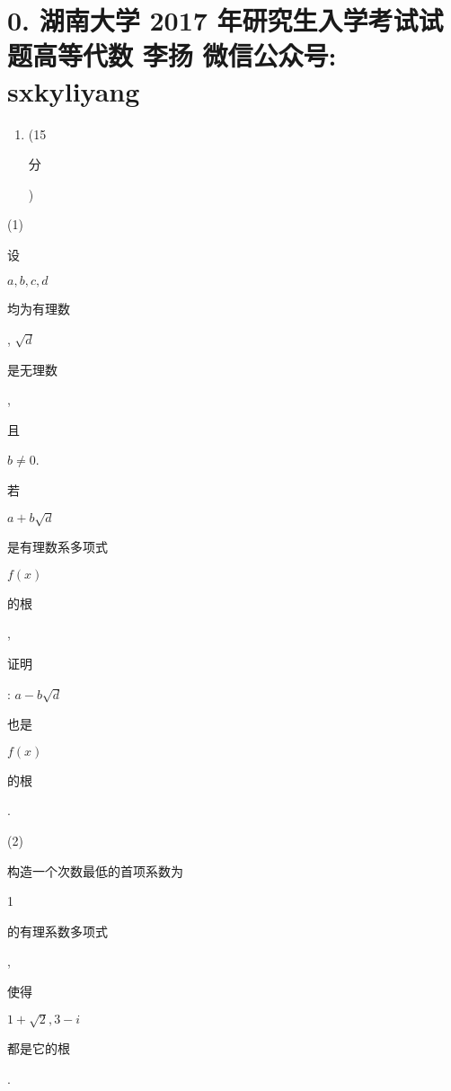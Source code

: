 \documentclass[10pt]{article}
\begin{document}
\section{0. 湖南大学 2017 年研究生入学考试试题高等代数 
 李扬 
 微信公众号: sxkyliyang}
\begin{enumerate}
  \item (15 \begin{CJK}{UTF8}{mj}分\end{CJK})
\end{enumerate}
(1) \begin{CJK}{UTF8}{mj}设\end{CJK} $a, b, c, d$ \begin{CJK}{UTF8}{mj}均为有理数\end{CJK}, $\sqrt{d}$ \begin{CJK}{UTF8}{mj}是无理数\end{CJK}, \begin{CJK}{UTF8}{mj}且\end{CJK} $b \neq 0$. \begin{CJK}{UTF8}{mj}若\end{CJK} $a+b \sqrt{d}$ \begin{CJK}{UTF8}{mj}是有理数系多项式\end{CJK} $f(x)$ \begin{CJK}{UTF8}{mj}的根\end{CJK}, \begin{CJK}{UTF8}{mj}证明\end{CJK}: $a-b \sqrt{d}$ \begin{CJK}{UTF8}{mj}也是\end{CJK} $f(x)$ \begin{CJK}{UTF8}{mj}的根\end{CJK}.

(2) \begin{CJK}{UTF8}{mj}构造一个次数最低的首项系数为\end{CJK} 1 \begin{CJK}{UTF8}{mj}的有理系数多项式\end{CJK}, \begin{CJK}{UTF8}{mj}使得\end{CJK} $1+\sqrt{2}, 3-i$ \begin{CJK}{UTF8}{mj}都是它的根\end{CJK}.
\end{document}
